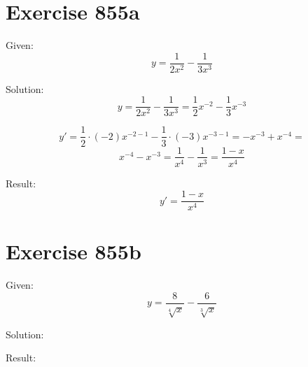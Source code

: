 \documentclass[a4paper, 10pt]{scrartcl}
\begin{document}
\section{Exercise 855a}

Given:
\[
y = \frac{1}{2x^{2}} - \frac{1}{3x^{3}}
\]

Solution:
\[
y = \frac{1}{2x^{2}} - \frac{1}{3x^{3}} = \frac{1}{2}x^{-2} - \frac{1}{3}x^{-3}
\]

\[
y' = \frac{1}{2}\cdot(-2)x^{-2 - 1} - \frac{1}{3}\cdot(-3)x^{-3 - 1} = -x^{-3} + x^{-4} =
\]
\[
x^{-4} - x^{-3} = \frac{1}{x^{4}} - \frac{1}{x^{3}} = \frac{1 - x}{x^{4}}
\]

Result:
\[
y' = \frac{1 - x}{x^{4}}
\]

\section{Exercise 855b}

Given:
\[
y = \frac{8}{\sqrt[4]{x}} - \frac{6}{\sqrt[3]{x}}
\]

Solution:

Result:
\end{document}
